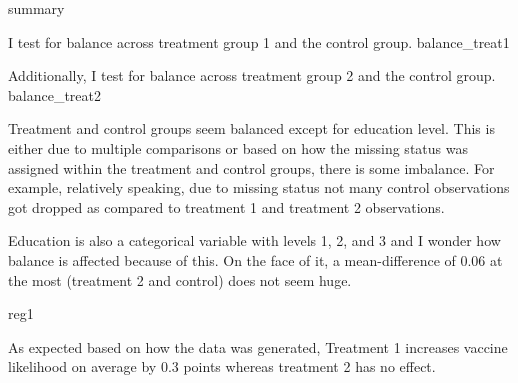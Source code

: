 \documentclass[11pt]{article}
\begin{document}
	{summary}
	
	I test for balance across treatment group 1 and the control group. 
	{balance_treat1}
	
	Additionally, I test for balance across treatment group 2 and the control group. 
	{balance_treat2}
	
	Treatment and control groups seem balanced except for education level. This is either due to multiple comparisons or based on how the missing status was assigned within the treatment and control groups, there is some imbalance. For example, relatively speaking, due to missing status not many control observations got dropped as compared to treatment 1 and treatment 2 observations.
	
	Education is also a categorical variable with levels 1, 2, and 3 and I wonder how balance is affected because of this. On the face of it, a mean-difference of 0.06 at the most (treatment 2 and control) does not seem huge. 
	
	{reg1}
	
	As expected based on how the data was generated, Treatment 1 increases vaccine likelihood on average by 0.3 points whereas treatment 2 has no effect. 
\end{document}
